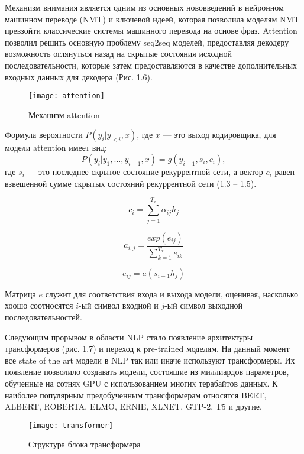Механизм внимания является одним из основных нововведений в нейронном машинном переводе (NMT) и ключевой идеей, которая позволила моделям NMT превзойти классические системы машинного перевода на основе фраз. Attention позволил решить основную проблему seq2seq моделей, предоставляя декодеру возможность оглянуться назад на скрытые состояния исходной последовательности, которые затем предоставляются в качестве дополнительных входных данных для декодера (Рис. 1.6).

\begin{figure}[ht]
	\centering
	\texttt{[image: attention]}  
	\caption{ Механизм attention }
\end{figure}

Формула вероятности $P(y_i|y_{<i}, x)$, где $x$ --- это выход кодировщика, для модели attention имеет вид:
\begin{equation}
	P(y_i|y_1,\dots,y_{i-1}, x) = g(y_{i-1}, s_i, c_i),
\end{equation} где $s_i$ --- это последнее скрытое состояние рекуррентной сети, а вектор $c_i$ равен взвешенной сумме скрытых состояний рекуррентной сети (1.3 -- 1.5).

\begin{equation}
	c_i = \sum_{j=1}^{T_x}{\alpha_{ij}h_j}
\end{equation}

\begin{equation}
	a_{i,j} = \frac{exp(e_{ij})}{\sum_{k=1}^{T_x}{e_{ik}}}
\end{equation}

\begin{equation}
	e_{ij} = a(s_{i-1}h_j)
\end{equation}

Матрица $e$ служит для соответствия входа и выхода модели, оценивая, насколько хоошо соотносятся $i$-ый символ входной и $j$-ый символ выходной последовательностей.~\cite{attention}

Следующим прорывом в области NLP стало появление архитектуры трансформеров (рис. 1.7) и переход к pre-trained моделям. На данный момент все state of the art модели в NLP так или иначе используют трансформеры. Их появление позволило создавать модели, состоящие из миллиардов параметров, обученные на сотнях GPU с использованием многих терабайтов данных. К наиболее популярным предобученным трансформерам относятся BERT, ALBERT, ROBERTA, ELMO, ERNIE, XLNET, GTP-2, T5 и другие.

\begin{figure}[ht]
	\centering
	\texttt{[image: transformer]}  
	\caption{ Структура блока трансформера}
\end{figure}

